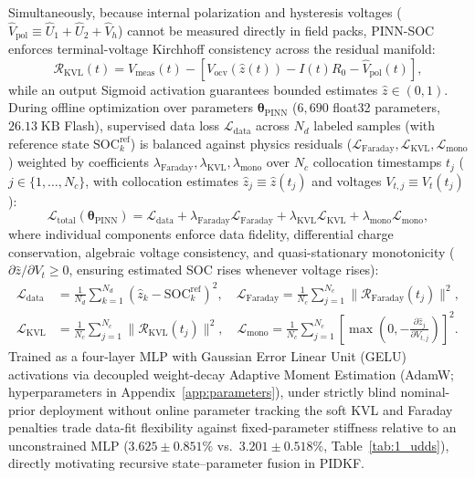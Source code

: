 \documentclass[10pt,a4paper]{article}
\begin{document}
Simultaneously, because internal polarization and hysteresis voltages ($\hat{V}_{\text{pol}} \equiv \hat{U}_1 + \hat{U}_2 + \hat{V}_h$) cannot be measured directly in field packs, PINN-SOC enforces terminal-voltage Kirchhoff consistency across the residual manifold:
\begin{equation}\label{eqn:res_kvl}
\mathcal{R}_{\text{KVL}}(t) = V_{\text{meas}}(t) - \left[ V_{\text{ocv}}(\hat{z}(t)) - I(t) R_0 - \hat{V}_{\text{pol}}(t) \right],
\end{equation}
while an output Sigmoid activation guarantees bounded estimates $\hat{z} \in (0, 1)$. During offline optimization over parameters $\boldsymbol{\theta}_{\text{PINN}}$ ($6,690$ float32 parameters, $26.13\;\mathrm{KB}$ Flash), supervised data loss $\mathcal{L}_{\text{data}}$ across $N_d$ labeled samples (with reference state $\text{SOC}_k^{\text{ref}}$) is balanced against physics residuals ($\mathcal{L}_{\text{Faraday}}, \mathcal{L}_{\text{KVL}}, \mathcal{L}_{\text{mono}}$) weighted by coefficients $\lambda_{\text{Faraday}}, \lambda_{\text{KVL}}, \lambda_{\text{mono}}$ over $N_c$ collocation timestamps $t_j$ ($j \in \{1,\dots,N_c\}$, with collocation estimates $\hat{z}_j \equiv \hat{z}(t_j)$ and voltages $V_{t,j} \equiv V_t(t_j)$):
\begin{equation}\label{eqn:pinn_loss}
\mathcal{L}_{\text{total}}(\boldsymbol{\theta}_{\text{PINN}}) = \mathcal{L}_{\text{data}} + \lambda_{\text{Faraday}} \mathcal{L}_{\text{Faraday}} + \lambda_{\text{KVL}} \mathcal{L}_{\text{KVL}} + \lambda_{\text{mono}} \mathcal{L}_{\text{mono}},
\end{equation}
where individual components enforce data fidelity, differential charge conservation, algebraic voltage consistency, and quasi-stationary monotonicity ($\partial \hat{z}/\partial V_t \ge 0$, ensuring estimated SOC rises whenever voltage rises):
\begin{align}
\mathcal{L}_{\text{data}} &= \frac{1}{N_d} \sum_{k=1}^{N_d} (\hat{z}_k - \text{SOC}_k^{\text{ref}})^2, \quad \mathcal{L}_{\text{Faraday}} = \frac{1}{N_c} \sum_{j=1}^{N_c} \|\mathcal{R}_{\text{Faraday}}(t_j)\|^2, \label{eqn:pinn_loss_data_faraday} \\
\mathcal{L}_{\text{KVL}} &= \frac{1}{N_c} \sum_{j=1}^{N_c} \|\mathcal{R}_{\text{KVL}}(t_j)\|^2, \quad \mathcal{L}_{\text{mono}} = \frac{1}{N_c}\sum_{j=1}^{N_c} \left[\max\left(0, -\frac{\partial \hat{z}_j}{\partial V_{t,j}}\right)\right]^2. \label{eqn:pinn_loss_kvl_mono}
\end{align}
Trained as a four-layer MLP with Gaussian Error Linear Unit (GELU) activations via decoupled weight-decay Adaptive Moment Estimation (AdamW; hyperparameters in Appendix~\ref{app:parameters}), under strictly blind nominal-prior deployment without online parameter tracking the soft KVL and Faraday penalties trade data-fit flexibility against fixed-parameter stiffness relative to an unconstrained MLP ($3.625\pm0.851\%$ vs.\ $3.201\pm0.518\%$, Table~\ref{tab:1_udds}), directly motivating recursive state--parameter fusion in PIDKF.
\end{document}
